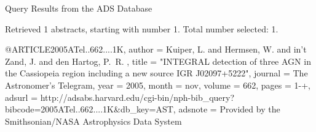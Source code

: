 Query Results from the ADS Database


Retrieved 1 abstracts, starting with number 1.  Total number selected: 1.

@ARTICLE{2005ATel..662....1K,
   author = {{Kuiper}, L. and {Hermsen}, W. and {in't Zand}, J. and {den Hartog}, P.~R.
	},
    title = "{INTEGRAL detection of three AGN in the Cassiopeia region including a new source IGR J02097+5222}",
  journal = {The Astronomer's Telegram},
     year = 2005,
    month = nov,
   volume = 662,
    pages = {1-+},
   adsurl = {http://adsabs.harvard.edu/cgi-bin/nph-bib_query?bibcode=2005ATel..662....1K&db_key=AST},
  adsnote = {Provided by the Smithsonian/NASA Astrophysics Data System}
}


